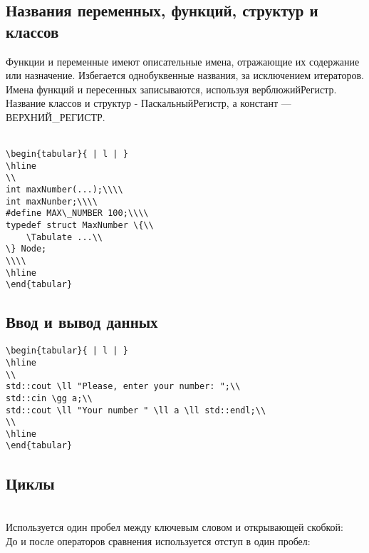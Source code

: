 \documentclass{article}
\begin{document}
\subsection{Названия переменных, функций, структур и классов}
Функции и переменные имеют описательные имена, отражающие их содержание или назначение. Избегается однобуквенные названия, за исключением итераторов.\\
Имена функций и пересенных записываются, используя верблюжийРегистр. Название классов и структур - ПаскальныйРегистр, а констант — ВЕРХНИЙ\_РЕГИСТР.\\\\
\begin{lstlisting}
\begin{tabular}{ | l | }
\hline
\\
int maxNumber(...);\\\\
int maxNunber;\\\\
#define MAX\_NUMBER 100;\\\\
typedef struct MaxNumber \{\\
    \Tabulate ...\\
\} Node;
\\\\
\hline
\end{tabular}
\end{lstlisting}


\subsection{Ввод и вывод данных}
\begin{lstlisting}
\begin{tabular}{ | l | }
\hline
\\
std::cout \ll "Please, enter your number: ";\\
std::cin \gg a;\\
std::cout \ll "Your number " \ll a \ll std::endl;\\
\\
\hline
\end{tabular}
\end{lstlisting}
\newpage

\subsection{Циклы\cite{two}}\\
Используется один пробел между ключевым словом и открывающей скобкой:\\
До и после операторов сравнения используется отступ в один пробел:\\\\
\end{document}
